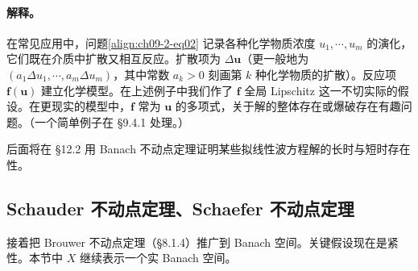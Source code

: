 \documentclass[../../main.tex]{subfiles}
\begin{document}
\paragraph{解释。}在常见应用中，问题\eqref{align:ch09-2-eq02} 记录各种化学物质浓度 $u_1,\cdots,u_m$ 的演化，它们既在介质中扩散又相互反应。扩散项为 $\Delta\mathbf{u}$（更一般地为 $(a_1\Delta u_1,\cdots,a_m\Delta u_m)$，其中常数 $a_k>0$ 刻画第 $k$ 种化学物质的扩散）。反应项 $\mathbf{f}(\mathbf{u})$ 建立化学模型。在上述例子中我们作了 $\mathbf{f}$ 全局 Lipschitz 这一不切实际的假设。在更现实的模型中，$\mathbf{f}$ 常为 $\mathbf{u}$ 的多项式，关于解的整体存在或爆破存在有趣问题。（一个简单例子在 \S9.4.1 处理。）

后面将在 \S12.2 用 Banach 不动点定理证明某些拟线性波方程解的长时与短时存在性。

\subsection{Schauder 不动点定理、Schaefer 不动点定理}\label{subsection:ch09-2-2-SchauderSchaefer}

接着把 Brouwer 不动点定理（\S8.1.4）推广到 Banach 空间。关键假设现在是紧性。本节中 $X$ 继续表示一个实 Banach 空间。
\end{document}
